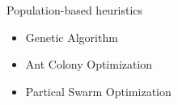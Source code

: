     \begin{frame}{Population-based heuristics}
      \Large
      \begin{spacing}{2}
        \begin{itemize}
          \item Genetic Algorithm
          \item Ant Colony Optimization
          \item Partical Swarm Optimization
        \end{itemize}
      \end{spacing}

    \end{frame}

